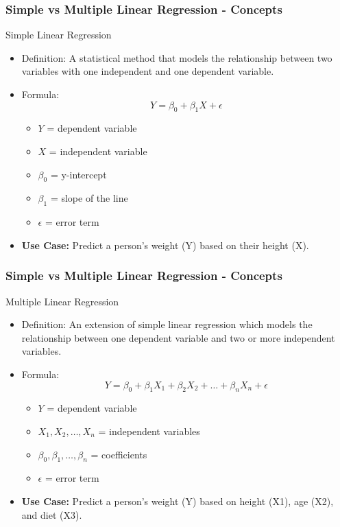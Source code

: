 \documentclass[aspectratio=169]{beamer}
\begin{document}
\begin{frame}[fragile]
  \frametitle{Simple vs Multiple Linear Regression - Concepts}
  \begin{block}{Simple Linear Regression}
    \begin{itemize}
      \item Definition: A statistical method that models the relationship between two variables with one independent and one dependent variable.
      \item Formula: 
      \begin{equation}
        Y = \beta_0 + \beta_1X + \epsilon
      \end{equation}
      \begin{itemize}
        \item \( Y \) = dependent variable
        \item \( X \) = independent variable
        \item \( \beta_0 \) = y-intercept
        \item \( \beta_1 \) = slope of the line
        \item \( \epsilon \) = error term
      \end{itemize}
      \item \textbf{Use Case:} Predict a person's weight (Y) based on their height (X).
    \end{itemize}
  \end{block}
\end{frame}

\begin{frame}[fragile]
  \frametitle{Simple vs Multiple Linear Regression - Concepts}
  \begin{block}{Multiple Linear Regression}
    \begin{itemize}
      \item Definition: An extension of simple linear regression which models the relationship between one dependent variable and two or more independent variables.
      \item Formula: 
      \begin{equation}
        Y = \beta_0 + \beta_1X_1 + \beta_2X_2 + \dots + \beta_nX_n + \epsilon
      \end{equation}
      \begin{itemize}
        \item \( Y \) = dependent variable
        \item \( X_1, X_2, \ldots, X_n \) = independent variables
        \item \( \beta_0, \beta_1, \ldots, \beta_n \) = coefficients
        \item \( \epsilon \) = error term
      \end{itemize}
      \item \textbf{Use Case:} Predict a person's weight (Y) based on height (X1), age (X2), and diet (X3).
    \end{itemize}
  \end{block}
\end{frame}
\end{document}
